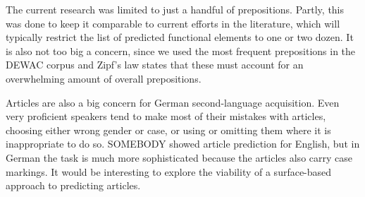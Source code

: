 \documentclass[draft,12pt]{article}
\begin{document}
The current research was limited to just a handful of prepositions. Partly, this
was done to keep it comparable to current efforts in the literature, which will
typically restrict the list of predicted functional elements to one or two
dozen. It is also not too big a concern, since we used the most frequent
prepositions in the DEWAC corpus and Zipf's law %
states that these must account for an overwhelming amount of overall
prepositions. %

Articles are also a big concern for German second-language acquisition. Even
very proficient speakers tend to make most of their mistakes with articles,
choosing either wrong gender or case, or using or omitting them where it is
inappropriate to do so. SOMEBODY %
showed article prediction for English, but in German the task is much more
sophisticated because the articles also carry case markings. It would be
interesting to explore the viability of a surface-based approach to predicting
articles.


\end{document}
